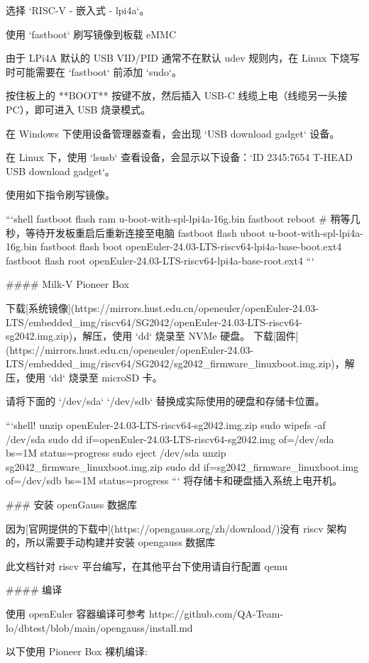 \documentclass{article}
\begin{document}
\begin{markdown}
选择 `RISC-V - 嵌入式 - lpi4a`。

使用 `fastboot` 刷写镜像到板载 eMMC

由于 LPi4A 默认的 USB VID/PID 通常不在默认 udev 规则内，在 Linux 下烧写时可能需要在 `fastboot` 前添加 `sudo`。

按住板上的 **BOOT** 按键不放，然后插入 USB-C 线缆上电（线缆另一头接 PC），即可进入 USB 烧录模式。

在 Windows 下使用设备管理器查看，会出现 `USB download gadget` 设备。

在 Linux 下，使用 `lsusb` 查看设备，会显示以下设备：`ID 2345:7654 T-HEAD USB download gadget`。

使用如下指令刷写镜像。

```shell
fastboot flash ram u-boot-with-spl-lpi4a-16g.bin
fastboot reboot
# 稍等几秒，等待开发板重启后重新连接至电脑
fastboot flash uboot u-boot-with-spl-lpi4a-16g.bin
fastboot flash boot openEuler-24.03-LTS-riscv64-lpi4a-base-boot.ext4
fastboot flash root openEuler-24.03-LTS-riscv64-lpi4a-base-root.ext4
```

#### Milk-V Pioneer Box

下载[系统镜像](https://mirrors.hust.edu.cn/openeuler/openEuler-24.03-LTS/embedded_img/riscv64/SG2042/openEuler-24.03-LTS-riscv64-sg2042.img.zip)，解压，使用 `dd` 烧录至 NVMe 硬盘。
下载[固件](https://mirrors.hust.edu.cn/openeuler/openEuler-24.03-LTS/embedded_img/riscv64/SG2042/sg2042_firmware_linuxboot.img.zip)，解压，使用 `dd` 烧录至 microSD 卡。

请将下面的 `/dev/sda` `/dev/sdb` 替换成实际使用的硬盘和存储卡位置。

```shell!
unzip openEuler-24.03-LTS-riscv64-sg2042.img.zip
sudo wipefs -af /dev/sda
sudo dd if=openEuler-24.03-LTS-riscv64-sg2042.img of=/dev/sda bs=1M status=progress
sudo eject /dev/sda
unzip sg2042_firmware_linuxboot.img.zip
sudo dd if=sg2042_firmware_linuxboot.img of=/dev/sdb bs=1M status=progress
```
将存储卡和硬盘插入系统上电开机。

### 安装 openGauss 数据库

因为[官网提供的下载中](https://opengauss.org/zh/download/)没有 riscv 架构的，所以需要手动构建并安装 opengauss 数据库

此文档针对 riscv 平台编写，在其他平台下使用请自行配置 qemu

#### 编译

使用 openEuler 容器编译可参考 https://github.com/QA-Team-lo/dbtest/blob/main/opengauss/install.md

以下使用 Pioneer Box 裸机编译:


\end{markdown}
\end{document}

